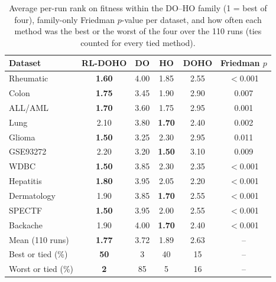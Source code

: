 \documentclass[journal]{IEEEtran}
\begin{document}
\begin{table}[t]
\centering
\caption{Average per-run rank on fitness within the DO--HO family (1 = best of four), family-only Friedman $p$-value per dataset, and how often each method was the best or the worst of the four over the 110 runs (ties counted for every tied method).}
\label{tab:family}
\footnotesize
\setlength{\tabcolsep}{3.5pt}
\begin{tabular}{@{}lccccc@{}}
\toprule
Dataset & RL-DOHO & DO & HO & DOHO & Friedman $p$ \\
\midrule
Rheumatic & \textbf{1.60} & 4.00 & 1.85 & 2.55 & $<$0.001 \\
\midrule
Colon & \textbf{1.75} & 3.45 & 1.90 & 2.90 & 0.007 \\
ALL/AML & \textbf{1.70} & 3.60 & 1.75 & 2.95 & 0.001 \\
Lung & 2.10 & 3.80 & \textbf{1.70} & 2.40 & 0.002 \\
Glioma & \textbf{1.50} & 3.25 & 2.30 & 2.95 & 0.011 \\
GSE93272 & 2.20 & 3.20 & \textbf{1.50} & 3.10 & 0.009 \\
\midrule
WDBC & \textbf{1.50} & 3.85 & 2.30 & 2.35 & $<$0.001 \\
Hepatitis & \textbf{1.80} & 3.95 & 2.05 & 2.20 & $<$0.001 \\
Dermatology & 1.90 & 3.85 & \textbf{1.70} & 2.55 & $<$0.001 \\
SPECTF & \textbf{1.50} & 3.95 & 2.00 & 2.55 & $<$0.001 \\
Backache & 1.90 & 4.00 & \textbf{1.70} & 2.40 & $<$0.001 \\
\midrule
Mean (110 runs) & \textbf{1.77} & 3.72 & 1.89 & 2.63 & -- \\
Best or tied (\%) & \textbf{50} & 3 & 40 & 15 & -- \\
Worst or tied (\%) & \textbf{2} & 85 & 5 & 16 & -- \\
\bottomrule
\end{tabular}
\end{table}
\end{document}
